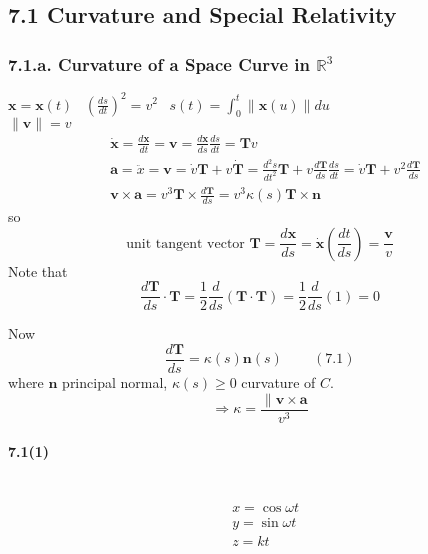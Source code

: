 
\subsection{7.1 Curvature and Special Relativity}

\subsubsection{7.1.a. Curvature of a Space Curve in $\mathbb{R}^3$}

$\mathbf{x} = \mathbf{x}(t)$ \, \quad $\left( \frac{ds}{dt} \right)^2 = v^2$ \, \quad $s(t) = \int_0^t \| \mathbf{x}(u) \| du$ \\
$\| \mathbf{v} \| = v$\[
\begin{aligned}
        & \dot{ \mathbf{x}} = \frac{d\mathbf{x}}{dt} = \mathbf{v} = \frac{d\mathbf{x}}{ds} \frac{ds}{dt} = \mathbf{T} v \\ 
        & \mathbf{a} = \ddot{x} = \mathbf{v} = \dot{v} \mathbf{T} + v\dot{\mathbf{T}} = \frac{d^2s}{dt^2} \mathbf{T} + v \frac{d\mathbf{T}}{ds} \frac{ds}{dt} = \dot{v} \mathbf{T} + v^2 \frac{d\mathbf{T}}{ds} \\ 
        & \mathbf{v} \times \mathbf{a} = v^3 \mathbf{T} \times \frac{d\mathbf{T}}{ds} = v^3 \kappa(s) \mathbf{T} \times \mathbf{n}
\end{aligned}
\]
so 
\[
\text{unit tangent vector } \mathbf{T} = \frac{d\mathbf{x}}{ds} = \dot{ \mathbf{x}} \left( \frac{dt}{ds} \right) = \frac{ \mathbf{v}}{v}
\]
Note that 
\[
\frac{d\mathbf{T}}{ds} \cdot \mathbf{T} = \frac{1}{2} \frac{d}{ds} \left( \mathbf{T} \cdot \mathbf{T} \right) = \frac{1}{2} \frac{d}{ds} (1) = 0 
\]

Now
\[
\frac{d\mathbf{T}}{ds} = \kappa(s) \mathbf{n}(s) \quad \quad \, (7.1)
\]
where $\mathbf{n}$ principal normal, $\kappa(s) \geq 0$ curvature of $C$.  
\[
\Longrightarrow \kappa = \frac{ \| \mathbf{v} \times \mathbf{a} }{v^3}
\]
\paragraph{7.1(1)}\ \\
\[
\begin{aligned}
        & x = \cos{\omega t} \\ 
        & y = \sin{\omega t} \\ 
        & z = kt 
\end{aligned} %
\]

